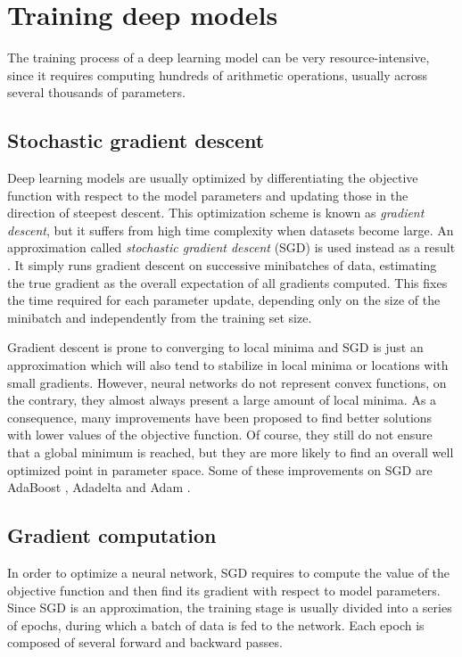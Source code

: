 \section{Training deep models}

The training process of a deep learning model can be very resource-intensive, since it requires computing hundreds of arithmetic operations, usually across several thousands of parameters. 

\subsection{Stochastic gradient descent}

Deep learning models are usually optimized by differentiating the objective function with respect to the model parameters and updating those in the direction of steepest descent. This optimization scheme is known as \textit{gradient descent}, but it suffers from high time complexity when datasets become large. An approximation called \textit{stochastic gradient descent} (SGD) is used instead as a result . It simply runs gradient descent on successive minibatches of data, estimating the true gradient as the overall expectation of all gradients computed. This fixes the time required for each parameter update, depending only on the size of the minibatch and independently from the training set size.

Gradient descent is prone to converging to local minima and SGD is just an approximation which will also tend to stabilize in local minima or locations with small gradients. However, neural networks do not represent convex functions, on the contrary, they almost always present a large amount of local minima. As a consequence, many improvements have been proposed to find better solutions with lower values of the objective function. Of course, they still do not ensure that a global minimum is reached, but they are more likely to find an overall well optimized point in parameter space. Some of these improvements on SGD are AdaBoost , Adadelta  and Adam .

\subsection{Gradient computation}

In order to optimize a neural network, SGD requires to compute the value of the objective function and then find its gradient with respect to model parameters. Since SGD is an approximation,  
the training stage is usually divided into a series of epochs, during which a batch of data is fed to the network. Each epoch is composed of several forward and backward passes. 


